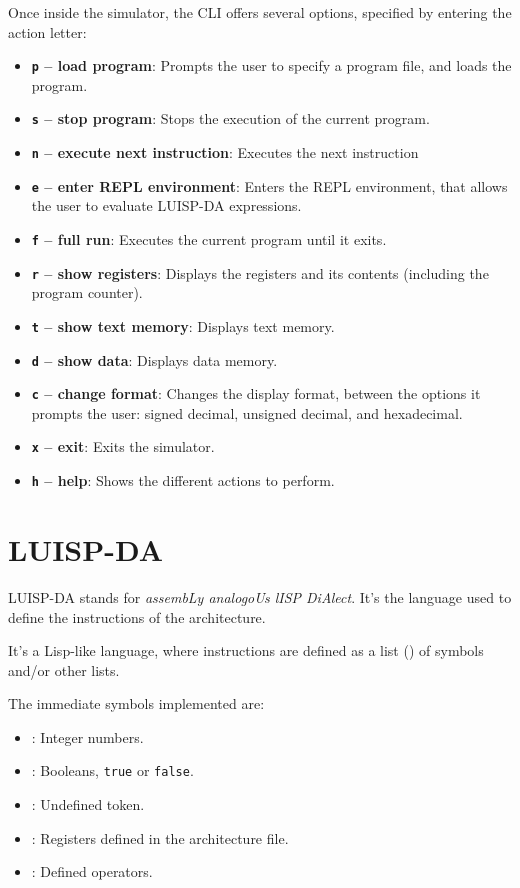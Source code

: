 Once inside the simulator, the CLI offers several options, specified by entering the action letter:
\begin{itemize}
  \item \textbf{\texttt{p} -- load program}: Prompts the user to specify a program file, and loads the program.
  \item \textbf{\texttt{s} -- stop program}: Stops the execution of the current program.
  \item \textbf{\texttt{n} -- execute next instruction}: Executes the next instruction
  \item \textbf{\texttt{e} -- enter REPL environment}: Enters the REPL environment, that allows the user to evaluate LUISP-DA expressions.
  \item \textbf{\texttt{f} -- full run}: Executes the current program until it exits.
  \item \textbf{\texttt{r} -- show registers}: Displays the registers and its contents (including the program counter).
  \item \textbf{\texttt{t} -- show text memory}: Displays text memory.
  \item \textbf{\texttt{d} -- show data}: Displays data memory.
  \item \textbf{\texttt{c} -- change format}: Changes the display format, between the options it prompts the user: signed decimal, unsigned decimal, and hexadecimal.
  \item \textbf{\texttt{x} -- exit}: Exits the simulator.
  \item \textbf{\texttt{h} -- help}: Shows the different actions to perform.
\end{itemize}



\section*{LUISP-DA}
LUISP-DA stands for \textit{assembLy analogoUs lISP DiAlect}. It's the language used to define the instructions of the architecture.

It's a Lisp-like language, where instructions are defined as a list () of symbols and/or other lists.

The immediate symbols implemented are:
\begin{itemize}
  \item {}: Integer numbers.
  \item {}: Booleans, \texttt{true} or \texttt{false}.
  \item {}: Undefined token.
  \item {}: Registers defined in the architecture file.
  \item {}: Defined operators.
\end{itemize}

